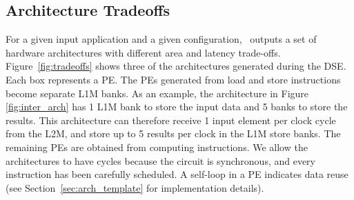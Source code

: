 \subsection{Architecture Tradeoffs}
\label{ssec:arch_tradeoffs}
\vspace{-1mm}
For a given input application and a given configuration, \frameworkname~outputs a set of hardware architectures with different area and latency trade-offs. Figure~\ref{fig:tradeoffs} shows three of the architectures generated during the DSE. Each box represents a PE. The PEs generated from load and store instructions become separate L1M banks. As an example, the architecture in Figure \ref{fig:inter_arch} has 1 L1M bank to store the input data and 5 banks to store the results. This architecture can therefore receive 1 input element per clock cycle from the L2M, and store up to 5 results per clock in the L1M store banks. The remaining PEs are obtained from computing instructions. We allow the architectures to have cycles because the circuit is synchronous, and every instruction has been carefully scheduled. A self-loop in a PE indicates data reuse (see Section~\ref{sec:arch_template} for implementation details).
